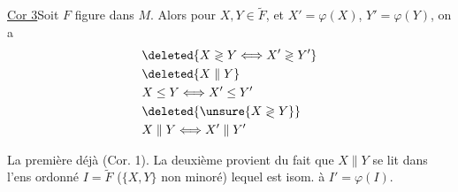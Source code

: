 \uline{Cor 3}\quad Soit $F$ figure dans $M$. Alors pour $X,Y\in\widetilde F$, et $X'=\varphi(X)$, $Y'=\varphi(Y)$, on a
\[
\begin{aligned}
&\deleted{X\gtrless Y\Longleftrightarrow X'\gtrless Y'}\\
&\deleted{X\parallel Y}\\
&X\leq Y\Longleftrightarrow X'\leq Y'\\
&\deleted{\unsure{X\gtrless Y}}\\
&X\parallel Y\Longleftrightarrow X'\parallel Y'
\end{aligned}
\]

La première\inserted{$\unsure{*}$}   déjà  (Cor. 1). La deuxième provient du fait que $X\parallel Y$ se lit dans l'ens ordonné $I=\widetilde F$ ($\{X,Y\}$ non minoré) lequel est isom. à $I'=\varphi(I)$.
